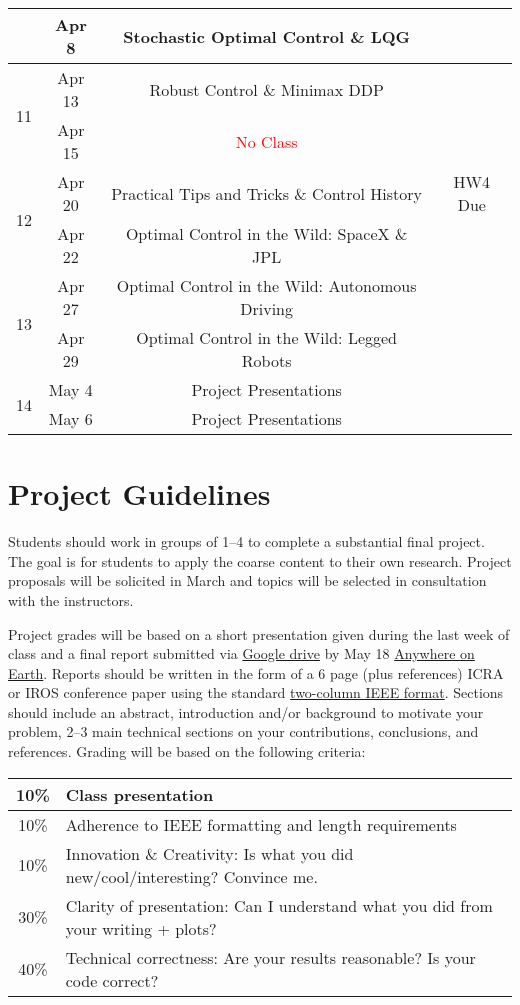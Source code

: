 \documentclass[11pt,letterpaper]{article}
\begin{document}
\begin{tabular}{c|c|c|c}
	 & Apr 8 & Stochastic Optimal Control \& LQG & \\
	 \hline
	\multirow{2}{*}{11}  & Apr 13 & Robust Control \& Minimax DDP &  \\
	 & Apr 15 & \textcolor{red}{No Class} &   \\
	 \hline
	\multirow{2}{*}{12}  & Apr 20 & Practical Tips and Tricks \& Control History &  HW4 Due \\
	 & Apr 22 & Optimal Control in the Wild: SpaceX \& JPL &   \\
	 \hline
	\multirow{2}{*}{13}  & Apr 27 & Optimal Control in the Wild: Autonomous Driving &  \\
	 & Apr 29 & Optimal Control in the Wild: Legged Robots &   \\
	 \hline
	\multirow{2}{*}{14}  & May 4 & Project Presentations &  \\
	 & May 6 & Project Presentations &   \\
\end{tabular}

\section*{Project Guidelines}

Students should work in groups of 1--4 to complete a substantial final project. The goal is for students to apply the coarse content to their own research. Project proposals will be solicited in March and topics will be selected in consultation with the instructors.

\medskip
\noindent
Project grades will be based on a short presentation given during the last week of class and a final report submitted via \href{https://forms.gle/j1xhW13DuvcYLf6j7}{Google drive} by May 18 \href{https://time.is/Anywhere_on_Earth}{Anywhere on Earth}. Reports should be written in the form of a 6 page (plus references) ICRA or IROS conference paper using the standard \href{https://www.ieee.org/conferences/publishing/templates.html}{two-column IEEE format}. Sections should include an abstract, introduction and/or background to motivate your problem, 2--3 main technical sections on your contributions, conclusions, and references. Grading will be based on the following criteria:
\newline
\newline
\begin{tabular}{|c|l|}
\hline
10\% & Class presentation \\
\hline
10\% & Adherence to IEEE formatting and length requirements \\
\hline
10\% & Innovation \& Creativity: Is what you did new/cool/interesting? Convince me. \\
\hline
30\% & Clarity of presentation: Can I understand what you did from your writing + plots? \\
\hline
40\% & Technical correctness: Are your results reasonable? Is your code correct? \\
\hline	
\end{tabular}
\end{document}
